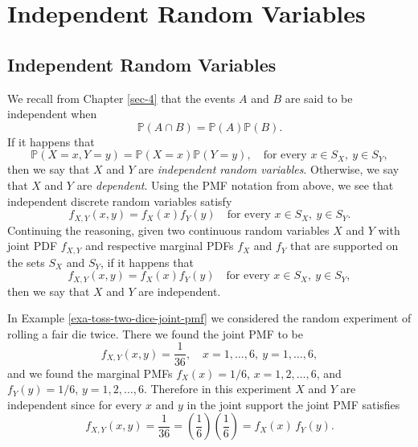 \documentclass[captions=tableheading]{scrbook}
\begin{document}
\section{Independent Random Variables}
\label{sec-7-4}
\label{sec-Independent-Random-Variables}
\subsection{Independent Random Variables}
\label{sec-7-4-1}
\label{sub-Independent-Random-Variables}


We recall from Chapter \ref{sec-4} that the events \(A\) and \(B\) are said to be independent when
\begin{equation}
\mathbb{P}(A\cap B)=\mathbb{P}(A)\mathbb{P}(B).
\end{equation}
If it happens that
\begin{equation}
\mathbb{P}(X=x,Y=y)=\mathbb{P}(X=x)\mathbb{P}(Y=y),\quad \mbox{for every }x\in S_{X},\ y\in S_{Y},
\end{equation}
then we say that \(X\) and \(Y\) are \emph{independent random variables}. Otherwise, we say that \(X\) and \(Y\) are \emph{dependent}. Using the PMF notation from above, we see that independent discrete random variables satisfy
\begin{equation}
f_{X,Y}(x,y)=f_{X}(x)f_{Y}(y)\quad \mbox{for every }x\in S_{X},\ y\in S_{Y}.
\end{equation}
Continuing the reasoning, given two continuous random variables \(X\) and \(Y\) with joint PDF \(f_{X,Y}\) and respective marginal PDFs \(f_{X}\) and \(f_{Y}\) that are supported on the sets \(S_{X}\) and \(S_{Y}\), if it happens that
\begin{equation}
f_{X,Y}(x,y)=f_{X}(x)f_{Y}(y)\quad \mbox{for every }x\in S_{X},\ y\in S_{Y},
\end{equation}
then we say that \(X\) and \(Y\) are independent.

\begin{example}
In Example \ref{exa-toss-two-dice-joint-pmf} we considered the random experiment of rolling a fair die twice. There we found the joint PMF to be
\[
f_{X,Y}(x,y)=\frac{1}{36},\quad x=1,\ldots,6,\ y=1,\ldots,6,
\]
and we found the marginal PMFs \(f_{X}(x)=1/6\), \(x=1,2,\ldots,6\), and \(f_{Y}(y)=1/6\), \(y=1,2,\ldots,6\). Therefore in this experiment \(X\) and \(Y\) are independent since for every \(x\) and \(y\) in the joint support the joint PMF satisfies
\[
f_{X,Y}(x,y)=\frac{1}{36}=\left(\frac{1}{6}\right)\left(\frac{1}{6}\right)=f_{X}(x)\, f_{Y}(y).
\]
\end{example}
\end{document}
